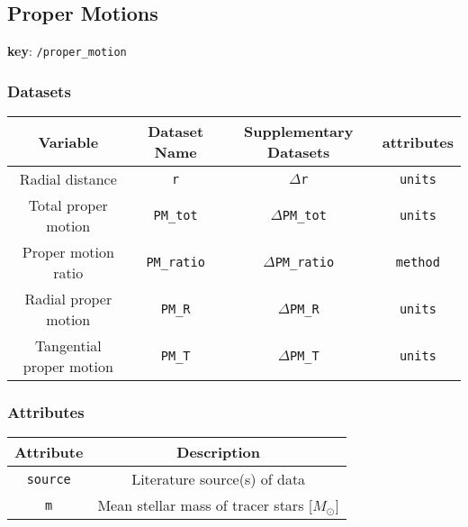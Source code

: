 \subsection{Proper Motions}

\textbf{key}: \texttt{/proper\_motion}

\subsubsection{Datasets}

\begin{center}
\begin{tabular}{ | c | c | c | c | }
    \hline
    Variable & Dataset Name & Supplementary Datasets &  attributes \\
    \hline\hline
    Radial distance & \texttt{r} & \texttt{\(\Delta\)r} & \texttt{units} \\
    \hline
    Total proper motion & \texttt{PM\_tot} & \texttt{\(\Delta\)PM\_tot} &
    \texttt{units}\\
    \hline
    Proper motion ratio & \texttt{PM\_ratio} & \texttt{\(\Delta\)PM\_ratio} &
    \texttt{method} \\
    \hline
    Radial proper motion & \texttt{PM\_R} & \texttt{\(\Delta\)PM\_R} &
    \texttt{units}\\
    \hline
    Tangential proper motion & \texttt{PM\_T} & \texttt{\(\Delta\)PM\_T} &
    \texttt{units}\\
    \hline
\end{tabular}
\end{center}

\subsubsection{Attributes}


\begin{center}
\begin{tabular}{ | c | c | }
    \hline
    Attribute & Description \\
    \hline\hline
    \texttt{source} & Literature source(s) of data \\
    \hline
    \texttt{m} & Mean stellar mass of tracer stars [\(M_\odot\)] \\
    \hline
\end{tabular}
\end{center}
